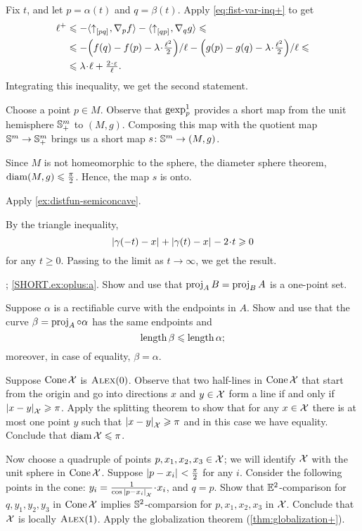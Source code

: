 Fix $t$, and let $p=\alpha(t)$ and $q=\beta(t)$.
Apply \ref{eq:fist-var-inq+} to get
\begin{align*}
 \ell^+
&\le -\<\dir{p}{q},\nabla_{p}f\>
-\<\dir{q}{p},\nabla_{q}g\>
\le
\\
&\le -{\left({f(q)}-{f(p)}-\lambda\cdot\tfrac{\ell^2}2\right)}/{\ell}
-{\left({g(p)}-{g(q)}-\lambda\cdot\tfrac{\ell^2}2\right)}/{\ell}\le
\\
&\le \lambda\cdot\ell+\tfrac{2\cdot\eps}{\ell}.
\end{align*}
Integrating this inequality, we get the second statement.

Choose a point $p\in M$.
Observe that $\operatorname{\rm gexp}\nolimits_p^1$ provides a short map from the unit hemisphere $\mathbb{S}_+^m$ to $(M,g)$.
Composing this map with the quotient map $\mathbb{S}^m\to \mathbb{S}_+^m$ brings us a short map $s\colon\mathbb{S}^m\to(M,g)$.

Since $M$ is not homeomorphic to the sphere,
the diameter sphere theorem, $\operatorname{\rm diam}\nolimits (M,g)\leqslant \tfrac\pi2$.
Hence, the map $s$ is onto.

 Apply \ref{ex:distfun-semiconcave}.

 By the triangle inequality, 
\[\dist{\gamma(-t)}{x}{}+\dist{\gamma(t)}{x}{}-2\cdot t\ge 0\]
for any $t\ge 0$.
Passing to the limit as $t\to\infty$, we get the result.

\parbf{\ref{ex:oplus}}; \ref{SHORT.ex:oplus:a}.
Show and use that $\operatorname{\rm proj}\nolimits_AB=\operatorname{\rm proj}\nolimits_BA$ is a one-point set.

 Suppose $\alpha$ is a rectifiable curve with the endpoints in $A$.
Show and use that the curve $\beta=\operatorname{\rm proj}\nolimits_A\circ\alpha$ has the same endpoints and
\[\mathop{\rm length}\nolimits\beta\leqslant \mathop{\rm length}\nolimits\alpha;\]
moreover, in case of equality, $\beta=\alpha$.

Suppose $\mathop{\rm Cone}\nolimits\mathcal{X}$ is $\textsc{Alex}(0)$.
Observe that two half-lines in $\mathop{\rm Cone}\nolimits\mathcal{X}$ that start from the origin and go into directions $x$ and $y\in\mathcal{X}$ form a line if and only if $|{x}-{y}|_{\mathcal{X}}^{{}}\geqslant \pi$.
Apply the splitting theorem to show that for any $x\in \mathcal{X}$ there is at most one point $y$ such that $|{x}-{y}|_{\mathcal{X}}^{{}}\geqslant \pi$ and in this case we have equality.
Conclude that $\operatorname{\rm diam}\nolimits \mathcal{X}\leqslant \pi$.

Now choose a quadruple of points $p,x_1,x_2,x_3\in \mathcal{X}$;
we will identify $\mathcal{X}$ with the unit sphere in $\mathop{\rm Cone}\nolimits\mathcal{X}$.
Suppose $|{p}-{x_i}|_{}^{{}}<\tfrac\pi2$ for any $i$.
Consider the following points in the cone: $y_i=\tfrac1{\cos \dist{p}{x_i}{\spc{X}}}\cdot x_i$, and $q=p$.
Show that $\mathbb{E}^2$-comparison for $q,y_1,y_2,y_3$ in $\mathop{\rm Cone}\nolimits\mathcal{X}$ implies $\mathbb{S}^2$-comparsion for $p,x_1,x_2,x_3$ in $\mathcal{X}$.
Conclude that $\mathcal{X}$ is locally $\textsc{Alex}(1)$. 
Apply the globalization theorem (\ref{thm:globalization+}).

